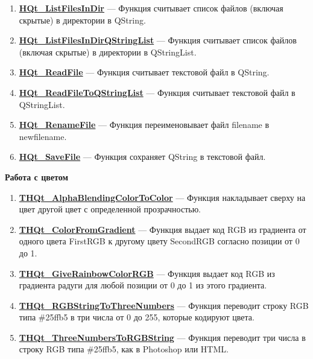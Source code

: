 \documentclass[a4paper,12pt]{article}
\begin{document}
\begin{enumerate}
\item \textbf{\hyperref[HQt_ListFilesInDir]{HQt\_ListFilesInDir}} --- Функция считывает список файлов (включая скрытые) в директории в QString.

\item \textbf{\hyperref[HQt_ListFilesInDirQStringList]{HQt\_ListFilesInDirQStringList}} --- Функция считывает список файлов (включая скрытые) в директории в QStringList.

\item \textbf{\hyperref[HQt_ReadFile]{HQt\_ReadFile}} --- Функция считывает текстовой файл в QString.

\item \textbf{\hyperref[HQt_ReadFileToQStringList]{HQt\_ReadFileToQStringList}} --- Функция считывает текстовой файл в QStringList.

\item \textbf{\hyperref[HQt_RenameFile]{HQt\_RenameFile}} --- Функция переименовывает файл filename в newfilename.

\item \textbf{\hyperref[HQt_SaveFile]{HQt\_SaveFile}} --- Функция сохраняет QString в текстовой файл.

\end{enumerate}

\textbf{Работа с цветом}
\begin{enumerate}

\item \textbf{\hyperref[THQt_AlphaBlendingColorToColor]{THQt\_AlphaBlendingColorToColor}} --- Функция накладывает сверху на цвет другой цвет с определенной прозрачностью.

\item \textbf{\hyperref[THQt_ColorFromGradient]{THQt\_ColorFromGradient}} --- Функция выдает код RGB из градиента от одного цвета FirstRGB к другому цвету SecondRGB согласно позиции от 0 до 1.

\item \textbf{\hyperref[THQt_GiveRainbowColorRGB]{THQt\_GiveRainbowColorRGB}} --- Функция выдает код RGB из градиента радуги для любой позиции от 0 до 1 из этого градиента.

\item \textbf{\hyperref[THQt_RGBStringToThreeNumbers]{THQt\_RGBStringToThreeNumbers}} --- Функция переводит строку RGB типа \#25ffb5 в три числа от 0 до 255, которые кодируют  цвета.

\item \textbf{\hyperref[THQt_ThreeNumbersToRGBString]{THQt\_ThreeNumbersToRGBString}} --- Функция переводит три числа в строку RGB типа \#25ffb5, как в Photoshop или HTML.

\end{enumerate}
\end{document}
